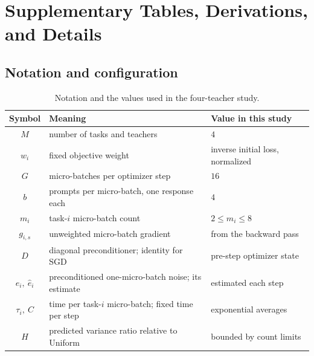 \section{Supplementary Tables, Derivations, and Details}

\subsection{Notation and configuration}
\label{app:reference_tables}

\begin{table}[H]
\centering
\small
\caption{Notation and the values used in the four-teacher study.}
\label{tab:notation}
\begin{tabular}{cll}
\toprule
Symbol & Meaning & Value in this study \\
\midrule
$M$ & number of tasks and teachers & $4$ \\
$w_i$ & fixed objective weight & inverse initial loss, normalized \\
$G$ & micro-batches per optimizer step & $16$ \\
$b$ & prompts per micro-batch, one response each & $4$ \\
$m_i$ & task-$i$ micro-batch count & $2\leq m_i\leq8$ \\
$g_{i,s}$ & unweighted micro-batch gradient & from the backward pass \\
$D$ & diagonal preconditioner; identity for SGD & pre-step optimizer state \\
$e_i,\ \widehat e_i$ & preconditioned one-micro-batch noise; its estimate & estimated each step \\
$\tau_i,\ C$ & time per task-$i$ micro-batch; fixed time per step & exponential averages \\
$H$ & predicted variance ratio relative to Uniform & bounded by count limits \\
\bottomrule
\end{tabular}
\end{table}


